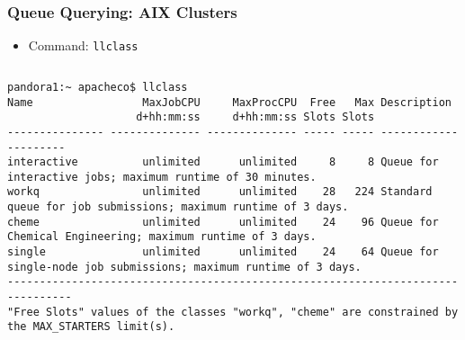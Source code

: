 \documentclass[slidestop,mathserif,compress,xcolor=svgnames,table]{beamer}
\newenvironment{eblock}[0]
{
\begin{beamerboxesrounded}[upper=uppercol2,lower=lowercol2,shadow=true]}
{\end{beamerboxesrounded}}
\begin{document}
\begin{frame}[fragile]
\frametitle{\small Queue Querying: AIX Clusters}
\begin{itemize}
\item Command: \texttt{llclass}
\end{itemize}
\begin{columns}
\column{12cm}
\begin{eblock}{}
{\tiny
\begin{verbatim}
pandora1:~ apacheco$ llclass
Name                 MaxJobCPU     MaxProcCPU  Free   Max Description          
                    d+hh:mm:ss     d+hh:mm:ss Slots Slots                      
--------------- -------------- -------------- ----- ----- ---------------------
interactive          unlimited      unlimited     8     8 Queue for interactive jobs; maximum runtime of 30 minutes.
workq                unlimited      unlimited    28   224 Standard queue for job submissions; maximum runtime of 3 days.
cheme                unlimited      unlimited    24    96 Queue for Chemical Engineering; maximum runtime of 3 days.
single               unlimited      unlimited    24    64 Queue for single-node job submissions; maximum runtime of 3 days.
--------------------------------------------------------------------------------
"Free Slots" values of the classes "workq", "cheme" are constrained by the MAX_STARTERS limit(s).
\end{verbatim}
}
\end{eblock}
\end{columns}
\end{frame}
\end{document}
